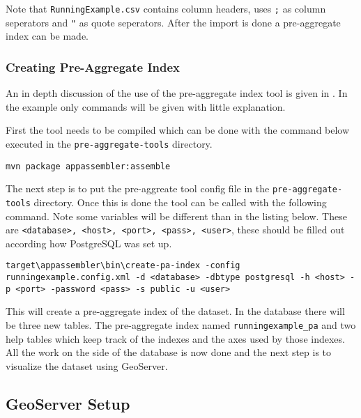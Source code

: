 Note that \lstinline|RunningExample.csv| contains column headers, uses \lstinline|;| as column seperators and \lstinline|"| as quote seperators. After the import is done a pre-aggregate index can be made.


\subsubsection{Creating Pre-Aggregate Index}
\label{sec:examplePreAggIndex}
An in depth discussion of the use of the pre-aggregate index tool is given in . In the example only commands will be given with little explanation.

First the tool needs to be compiled which can be done with the command below executed in the \lstinline|pre-aggregate-tools| directory.
\begin{lstlisting}
mvn package appassembler:assemble
\end{lstlisting}
The next step is to put the pre-aggreate tool config file in the \lstinline|pre-aggregate-tools| directory. Once this is done the tool can be called with the following command. Note some variables will be different than in the listing below. These are \lstinline|<database>, <host>, <port>, <pass>, <user>|, these should be filled out according how PostgreSQL was set up.
\begin{lstlisting}
target\appassembler\bin\create-pa-index -config runningexample.config.xml -d <database> -dbtype postgresql -h <host> -p <port> -password <pass> -s public -u <user>
\end{lstlisting}
This will create a pre-aggregate index of the dataset. In the database there will be three new tables. The pre-aggregate index named \lstinline|runningexample_pa| and two help tables which keep track of the indexes and the axes used by those indexes. All the work on the side of the database is now done and the next step is to visualize the dataset using GeoServer.

\pagebreak
\subsection{GeoServer Setup}
\label{sec:exampleGeoServer}
